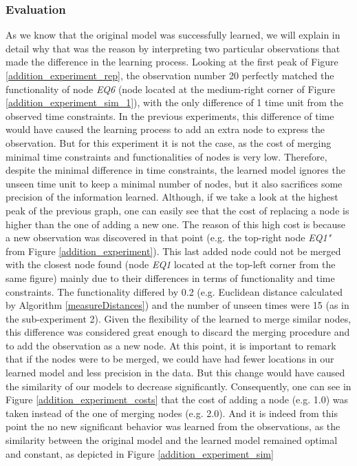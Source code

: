 \subsubsection{Evaluation}
As we know that the original model was successfully learned, we will explain in detail why that was the reason by interpreting two particular observations that made the difference in the learning process. Looking at the first peak of Figure \ref{addition_experiment_rep}, the observation number 20 perfectly matched the functionality of node \textit{EQ6} (node located at the medium-right corner of Figure \ref{addition_experiment_sim_1}), with the only difference of 1 time unit from the observed time constraints. In the previous experiments, this difference of time would have caused the learning process to add an extra node to express the observation. 
%
But for this experiment it is not the case, as the cost of merging minimal time constraints and functionalities of nodes is very low. Therefore, despite the minimal difference in time constraints, the learned model ignores the unseen time unit to keep a minimal number of nodes, but it also sacrifices some precision of the information learned.
%
Although, if we take a look at the highest peak of the previous graph, one can easily see that the cost of replacing a node is higher than the one of adding a new one. The reason of this high cost is because a new observation was discovered in that point (e.g. the top-right node \textit{EQ1"} from Figure \ref{addition_experiment}). This last added node could not be merged with the closest node found (node \textit{EQ1} located at the top-left corner from the same figure) mainly due to their differences in terms of functionality and time constraints. The functionality differed by 0.2 (e.g. Euclidean distance calculated by Algorithm \ref{measureDistances}) and the number of unseen times were 15 (as in the sub-experiment 2). Given the flexibility of the learned to merge similar nodes, this difference was considered great enough to discard the merging procedure and to add the observation as a new node. At this point, it is important to remark that if the nodes were to be merged, we could have had fewer locations in our learned model and less precision in the data. But this change would have caused the similarity of our models to decrease significantly.
%
%
Consequently, one can see in Figure \ref{addition_experiment_costs} that the cost of adding a node (e.g. 1.0) was taken instead of the one of merging nodes (e.g. 2.0). And it is indeed from this point the no new significant behavior was learned from the observations, as the similarity between the original model and the learned model remained optimal and constant, as depicted in Figure \ref{addition_experiment_sim}
%
\newpage

